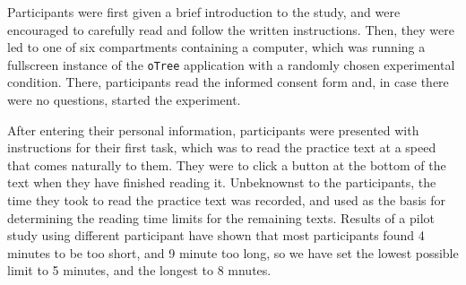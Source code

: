 \documentclass[12pt,]{article}
\begin{document}
Participants were first given a brief introduction to the study, and
were encouraged to carefully read and follow the written instructions.
Then, they were led to one of six compartments containing a computer,
which was running a fullscreen instance of the \texttt{oTree}
application with a randomly chosen experimental condition. There,
participants read the informed consent form and, in case there were no
questions, started the experiment.

After entering their personal information, participants were presented
with instructions for their first task, which was to read the practice
text at a speed that comes naturally to them. They were to click a
button at the bottom of the text when they have finished reading it.
Unbeknownst to the participants, the time they took to read the practice
text was recorded, and used as the basis for determining the reading
time limits for the remaining texts. Results of a pilot study using
different participant have shown that most participants found 4 minutes
to be too short, and 9 minute too long, so we have set the lowest
possible limit to 5 minutes, and the longest to 8 mnutes.



\end{document}
